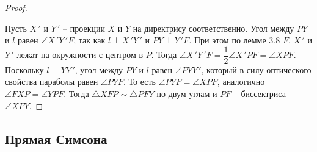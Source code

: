 \documentclass[12pt]{article}
\theoremstyle{definition}
\begin{document}
\begin{proof}
\begin{center}
        \end{center}
        Пусть $X\,'$ и $Y\,'$ -- проекции $X$ и $Y$ на директрису соответственно. Угол между $PY$ и $l$ равен $\angle X\,'Y\,'F$, так как $l\perp X\,'Y\,'$ и $PY\perp Y\,'F$. При этом по лемме 3.8 $F$, $X\,'$ и $Y\,'$ лежат на окружности с центром в $P$. Тогда $\angle X\,'Y\,'F=\dfrac{1}{2}\angle X\,'PF=\angle XPF$. Поскольку $l\,\|\, YY\,'$, угол между $PY$ и $l$ равен $\angle PYY\,'$, который в силу оптического свойства параболы равен $\angle PYF$. То есть $\angle PYF=\angle XPF$, аналогично $\angle FXP = \angle YPF$. Тогда $\triangle XFP \sim \triangle PFY$ по двум углам и $PF$ -- биссектриса $\angle XFY$.
    \end{proof}

\setcounter{subsection}{2}
\subsection{Прямая Симсона}
\end{document}
